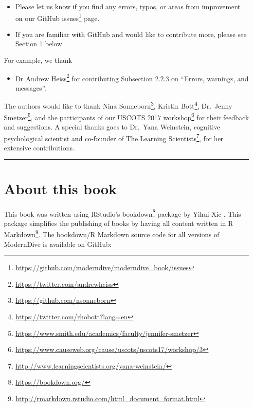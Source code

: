 \documentclass[12pt, krantz2,]{krantz}
\providecommand{\tightlist}{%
  \setlength{\itemsep}{0pt}\setlength{\parskip}{0pt}}
\renewcommand{\href}[2]{#2\footnote{\url{#1}}}
\begin{document}
\begin{itemize}
\tightlist
\item
  Please let us know if you find any errors, typos, or areas from improvement on our \href{https://github.com/moderndive/moderndive_book/issues}{GitHub issues} page.
\item
  If you are familiar with GitHub and would like to contribute more, please see Section \ref{sec:about-book} below.
\end{itemize}

For example, we thank

\begin{itemize}
\tightlist
\item
  \href{https://twitter.com/andrewheiss}{Dr Andrew Heiss} for contributing Subsection 2.2.3 on ``Errors, warnings, and messages''.
\end{itemize}

The authors would like to thank \href{https://github.com/nsonneborn}{Nina Sonneborn}, \href{https://twitter.com/rhobott?lang=en}{Kristin Bott}, \href{https://www.smith.edu/academics/faculty/jennifer-smetzer}{Dr.~Jenny Smetzer}, and the participants of our \href{https://www.causeweb.org/cause/uscots/uscots17/workshop/3}{USCOTS 2017 workshop} for their feedback and suggestions. A special thanks goes to Dr.~Yana Weinstein, cognitive psychological scientist and co-founder of \href{http://www.learningscientists.org/yana-weinstein/}{The Learning Scientists}, for her extensive contributions.

\begin{center}\rule{0.5\linewidth}{\linethickness}\end{center}

\hypertarget{sec:about-book}{%
\section{About this book}\label{sec:about-book}}

This book was written using RStudio's \href{https://bookdown.org/}{bookdown} package by Yihui Xie \citep{R-bookdown}. This package simplifies the publishing of books by having all content written in \href{http://rmarkdown.rstudio.com/html_document_format.html}{R Markdown}. The bookdown/R Markdown source code for all versions of ModernDive is available on GitHub:
\end{document}
